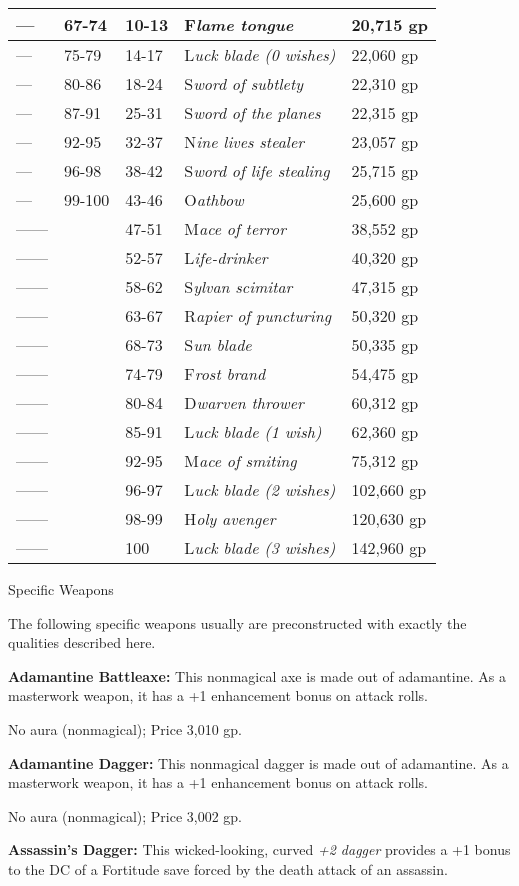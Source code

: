 \documentclass{article}
\begin{document}
\begin{tabular}{|>{\raggedright}p{32pt}|>{\raggedright}p{38pt}|>{\raggedright}p{29pt}|>{\raggedright}p{132pt}|>{\raggedright}p{58pt}|}
\hline
--- & 67-74 & 10-13 & F\textit{lame tongue} & 20,715 gp\tabularnewline
\hline
--- & 75-79 & 14-17 & L\textit{uck blade (0 wishes)} & 22,060 gp\tabularnewline
\hline
--- & 80-86 & 18-24 & S\textit{word of subtlety} & 22,310 gp\tabularnewline
\hline
--- & 87-91 & 25-31 & S\textit{word of the planes} & 22,315 gp\tabularnewline
\hline
--- & 92-95 & 32-37 & N\textit{ine lives stealer} & 23,057 gp\tabularnewline
\hline
--- & 96-98 & 38-42 & S\textit{word of life stealing} & 25,715 gp\tabularnewline
\hline
--- & 99-100 & 43-46 & O\textit{athbow} & 25,600 gp\tabularnewline
\hline
------ &  & 47-51 & M\textit{ace of terror} & 38,552 gp\tabularnewline
\hline
------ &  & 52-57 & L\textit{ife-drinker} & 40,320 gp\tabularnewline
\hline
------ &  & 58-62 & S\textit{ylvan scimitar} & 47,315 gp\tabularnewline
\hline
------ &  & 63-67 & R\textit{apier of puncturing} & 50,320 gp\tabularnewline
\hline
------ &  & 68-73 & S\textit{un blade} & 50,335 gp\tabularnewline
\hline
------ &  & 74-79 & F\textit{rost brand} & 54,475 gp\tabularnewline
\hline
------ &  & 80-84 & D\textit{warven thrower} & 60,312 gp\tabularnewline
\hline
------ &  & 85-91 & L\textit{uck blade (1 wish)} & 62,360 gp\tabularnewline
\hline
------ &  & 92-95 & M\textit{ace of smiting} & 75,312 gp\tabularnewline
\hline
------ &  & 96-97 & L\textit{uck blade (2 wishes)} & 102,660 gp\tabularnewline
\hline
------ &  & 98-99 & H\textit{oly avenger} & 120,630 gp\tabularnewline
\hline
------ &  & 100 & L\textit{uck blade (3 wishes)} & 142,960 gp\tabularnewline
\hline
\end{tabular}

\vspace{12pt}
Specific Weapons

The following specific weapons usually are preconstructed with exactly the qualities 
described here.

\textbf{Adamantine Battleaxe:} This nonmagical axe is made out of adamantine. As 
a masterwork weapon, it has a +1 enhancement bonus on attack rolls.

No aura (nonmagical); Price 3,010 gp.

\textbf{Adamantine Dagger: }This nonmagical dagger is made out of adamantine. As 
a masterwork weapon, it has a +1 enhancement bonus on attack rolls.

No aura (nonmagical); Price 3,002 gp.

\textbf{Assassin's Dagger:} This wicked-looking, curved \textit{+2 dagger }provides 
a +1 bonus to the DC of a Fortitude save forced by the death attack of an assassin.
\end{document}

